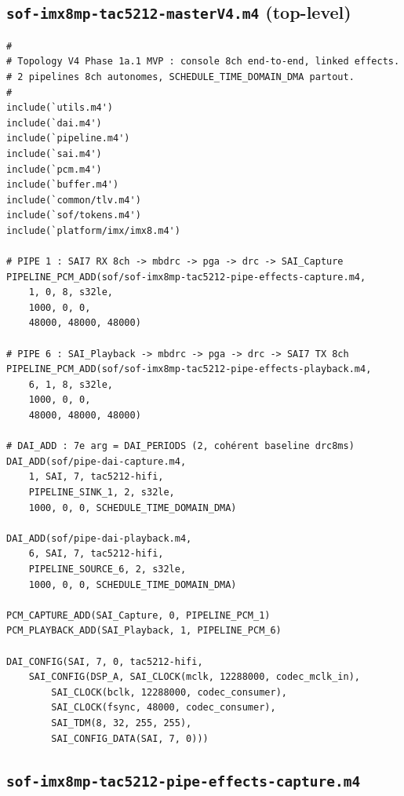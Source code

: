 \documentclass[11pt,a4paper]{article}
\begin{document}
\subsection{\texttt{sof-imx8mp-tac5212-masterV4.m4} (top-level)}

\begin{lstlisting}[language={}, basicstyle=\ttfamily\scriptsize]
#
# Topology V4 Phase 1a.1 MVP : console 8ch end-to-end, linked effects.
# 2 pipelines 8ch autonomes, SCHEDULE_TIME_DOMAIN_DMA partout.
#
include(`utils.m4')
include(`dai.m4')
include(`pipeline.m4')
include(`sai.m4')
include(`pcm.m4')
include(`buffer.m4')
include(`common/tlv.m4')
include(`sof/tokens.m4')
include(`platform/imx/imx8.m4')

# PIPE 1 : SAI7 RX 8ch -> mbdrc -> pga -> drc -> SAI_Capture
PIPELINE_PCM_ADD(sof/sof-imx8mp-tac5212-pipe-effects-capture.m4,
    1, 0, 8, s32le,
    1000, 0, 0,
    48000, 48000, 48000)

# PIPE 6 : SAI_Playback -> mbdrc -> pga -> drc -> SAI7 TX 8ch
PIPELINE_PCM_ADD(sof/sof-imx8mp-tac5212-pipe-effects-playback.m4,
    6, 1, 8, s32le,
    1000, 0, 0,
    48000, 48000, 48000)

# DAI_ADD : 7e arg = DAI_PERIODS (2, cohérent baseline drc8ms)
DAI_ADD(sof/pipe-dai-capture.m4,
    1, SAI, 7, tac5212-hifi,
    PIPELINE_SINK_1, 2, s32le,
    1000, 0, 0, SCHEDULE_TIME_DOMAIN_DMA)

DAI_ADD(sof/pipe-dai-playback.m4,
    6, SAI, 7, tac5212-hifi,
    PIPELINE_SOURCE_6, 2, s32le,
    1000, 0, 0, SCHEDULE_TIME_DOMAIN_DMA)

PCM_CAPTURE_ADD(SAI_Capture, 0, PIPELINE_PCM_1)
PCM_PLAYBACK_ADD(SAI_Playback, 1, PIPELINE_PCM_6)

DAI_CONFIG(SAI, 7, 0, tac5212-hifi,
    SAI_CONFIG(DSP_A, SAI_CLOCK(mclk, 12288000, codec_mclk_in),
        SAI_CLOCK(bclk, 12288000, codec_consumer),
        SAI_CLOCK(fsync, 48000, codec_consumer),
        SAI_TDM(8, 32, 255, 255),
        SAI_CONFIG_DATA(SAI, 7, 0)))
\end{lstlisting}

\subsection{\texttt{sof-imx8mp-tac5212-pipe-effects-capture.m4}}
\end{document}
